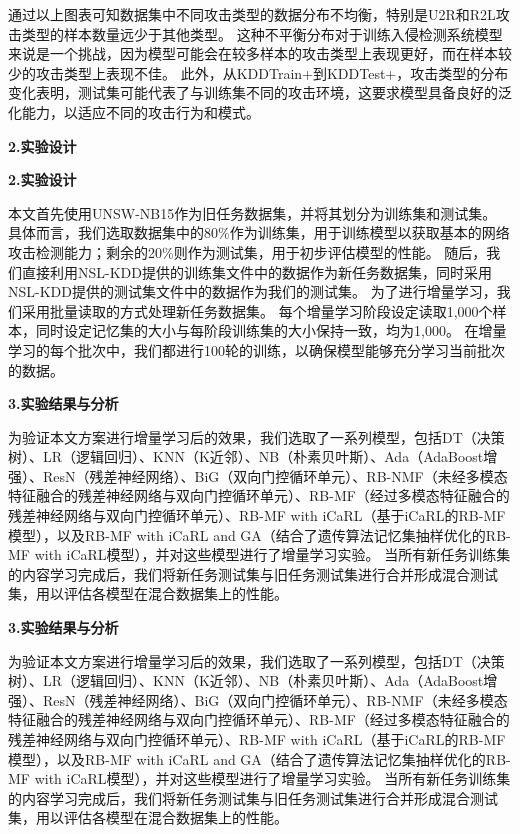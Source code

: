 \begin{table}[h]
\begin{table}[h]
通过以上图表可知数据集中不同攻击类型的数据分布不均衡，特别是U2R和R2L攻击类型的样本数量远少于其他类型。
这种不平衡分布对于训练入侵检测系统模型来说是一个挑战，因为模型可能会在较多样本的攻击类型上表现更好，而在样本较少的攻击类型上表现不佳。
此外，从KDDTrain+到KDDTest+，攻击类型的分布变化表明，测试集可能代表了与训练集不同的攻击环境，这要求模型具备良好的泛化能力，以适应不同的攻击行为和模式。\par

\textbf{2.实验设计}\par
\textbf{2.实验设计}\par
本文首先使用UNSW-NB15作为旧任务数据集，并将其划分为训练集和测试集。
具体而言，我们选取数据集中的80\%作为训练集，用于训练模型以获取基本的网络攻击检测能力；剩余的20\%则作为测试集，用于初步评估模型的性能。
随后，我们直接利用NSL-KDD提供的训练集文件中的数据作为新任务数据集，同时采用NSL-KDD提供的测试集文件中的数据作为我们的测试集。
为了进行增量学习，我们采用批量读取的方式处理新任务数据集。
每个增量学习阶段设定读取1,000个样本，同时设定记忆集的大小与每阶段训练集的大小保持一致，均为1,000。
在增量学习的每个批次中，我们都进行100轮的训练，以确保模型能够充分学习当前批次的数据。\par

\textbf{3.实验结果与分析}\par
为验证本文方案进行增量学习后的效果，我们选取了一系列模型，包括DT（决策树）、LR（逻辑回归）、KNN（K近邻）、NB（朴素贝叶斯）、Ada（AdaBoost增强）、ResN（残差神经网络）、BiG（双向门控循环单元）、RB-NMF（未经多模态特征融合的残差神经网络与双向门控循环单元）、RB-MF（经过多模态特征融合的残差神经网络与双向门控循环单元）、RB-MF with iCaRL（基于iCaRL的RB-MF模型），以及RB-MF with iCaRL and GA（结合了遗传算法记忆集抽样优化的RB-MF with iCaRL模型），并对这些模型进行了增量学习实验。
当所有新任务训练集的内容学习完成后，我们将新任务测试集与旧任务测试集进行合并形成混合测试集，用以评估各模型在混合数据集上的性能。\par

\textbf{3.实验结果与分析}\par
为验证本文方案进行增量学习后的效果，我们选取了一系列模型，包括DT（决策树）、LR（逻辑回归）、KNN（K近邻）、NB（朴素贝叶斯）、Ada（AdaBoost增强）、ResN（残差神经网络）、BiG（双向门控循环单元）、RB-NMF（未经多模态特征融合的残差神经网络与双向门控循环单元）、RB-MF（经过多模态特征融合的残差神经网络与双向门控循环单元）、RB-MF with iCaRL（基于iCaRL的RB-MF模型），以及RB-MF with iCaRL and GA（结合了遗传算法记忆集抽样优化的RB-MF with iCaRL模型），并对这些模型进行了增量学习实验。
当所有新任务训练集的内容学习完成后，我们将新任务测试集与旧任务测试集进行合并形成混合测试集，用以评估各模型在混合数据集上的性能。\par


\end{table}
\end{table}
